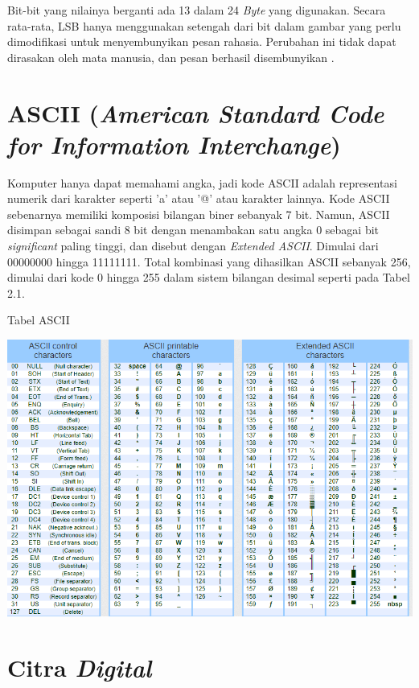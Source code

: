 Bit-bit yang nilainya berganti ada 13 dalam 24 \emph{Byte} yang digunakan. Secara rata-rata, LSB hanya menggunakan setengah dari bit dalam gambar yang perlu dimodifikasi untuk menyembunyikan pesan rahasia. Perubahan ini tidak dapat dirasakan oleh mata manusia, dan pesan berhasil disembunyikan \cite{elgabar2}.

\section{ASCII (\emph{American Standard Code for Information Interchange})}
Komputer hanya dapat memahami angka, jadi kode ASCII adalah representasi numerik dari karakter seperti 'a' atau '@' atau karakter lainnya. Kode ASCII sebenarnya memiliki komposisi bilangan biner sebanyak 7 bit. Namun, ASCII disimpan sebagai sandi 8 bit dengan menambakan satu angka 0 sebagai bit \emph{significant} paling tinggi, dan disebut dengan \emph{Extended ASCII}. Dimulai dari 00000000 hingga 11111111. Total kombinasi yang dihasilkan ASCII sebanyak 256, dimulai dari kode 0 hingga 255 dalam sistem bilangan desimal seperti pada Tabel 2.1. \cite{ascii}
\begin{table}[H]
	\centering
	\caption{Tabel ASCII \cite{tableascii}}
	\includegraphics[width=1.0\textwidth]{gambar/table_ascii}
	\label{tabel_ascii}
\end{table}

\section{Citra \emph{Digital}}
